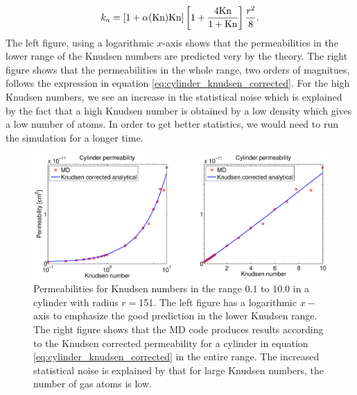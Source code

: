 \begin{align}
	\label{eq:cylinder_knudsen_corrected}
	k_a = [1 + \alpha(\text{Kn})\text{Kn}]\left[1 + {4\text{Kn}\over 1 + \text{Kn}}\right] {r^2\over 8}.
\end{align}
The left figure, using a logarithmic $x$-axis shows that the permeabilities in the lower range of the Knudsen numbers are predicted very by the theory. The right figure shows that the permeabilities in the whole range, two orders of magnitues, follows the expression in equation \eqref{eq:cylinder_knudsen_corrected}. For the high Knudsen numbers, we see an increase in the statistical noise which is explained by the fact that a high Knudsen number is obtained by a low density which gives a low number of atoms. In order to get better statistics, we would need to run the simulation for a longer time.
\begin{figure}[h]
\begin{center}
\includegraphics[width=1.0\textwidth, trim=0cm 0cm 0cm 0cm, clip]{MD/figures/permeability_cylinder.eps}
\end{center}
\caption{Permeabilities for Knudsen numbers in the range $0.1$ to $10.0$ in a cylinder with radius $r=$\unit{151}{\angstrom}. The left figure has a logarithmic $x-$axis to emphasize the good prediction in the lower Knudsen range. The right figure shows that the MD code produces results according to the Knudsen corrected permeability for a cylinder in equation \eqref{eq:cylinder_knudsen_corrected} in the entire range. The increased statistical noise is explained by that for large Knudsen numbers, the number of gas atoms is low.}
\label{fig:md_permeability}
\end{figure}